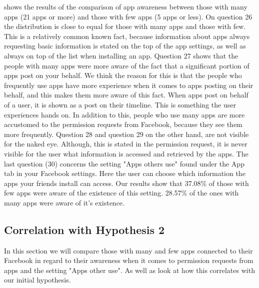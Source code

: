  shows the results of the comparison of app awareness between those with many apps (21 apps or more) and those with few apps (5 apps or less). On question 26 the distribution is close to equal for those with many apps and those with few. This is a relatively common known fact, because information about apps always requesting basic information is stated on the top of the app settings, as well as always on top of the list when installing an app. Question 27 shows that the people with many apps were more aware of the fact that a significant portion of apps post on your behalf. We think the reason for this is that the people who frequently use apps have more experience when it comes to apps posting on their behalf, and this makes them more aware of this fact. When apps post on behalf of a user, it is shown as a post on their timeline. This is something the user experiences hands on. In addition to this, people who use many apps are more accustomed to the permission requests from Facebook, because they see them more frequently. Question 28 and question 29 on the other hand, are not visible for the naked eye. Although, this is stated in the permission request, it is never visible for the user what information is accessed and retrieved by the apps. The last question (30) concerns the setting "Apps others use" found under the App tab in your Facebook settings. Here the user can choose which information the apps your friends install can access. Our results show that 37.08\% of those with few apps were aware of the existence of this setting. 28.57\% of the ones with many apps were aware of it's existence. 


\subsection{Correlation with Hypothesis 2}
In this section we will compare those with many and few apps connected to their Facebook in regard to their awareness when it comes to permission requests from apps and the setting "Apps other use". As well as look at how this correlates with our initial hypothesis. 

